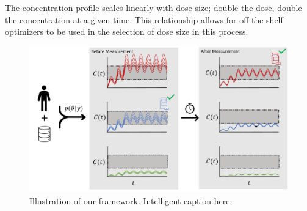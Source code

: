 The concentration profile scales linearly with dose size; double the dose, double the concentration at a given time.  This relationship allows for off-the-shelf optimizers to be used in the selection of dose size in this process.

\begin{figure}
	\centering
	\includegraphics[width=0.85\linewidth]{figures/process_figure_single}
	\caption{Illustration of our framework.  Intelligent caption here.}
	\label{fig:processfiguresingle}
\end{figure}

